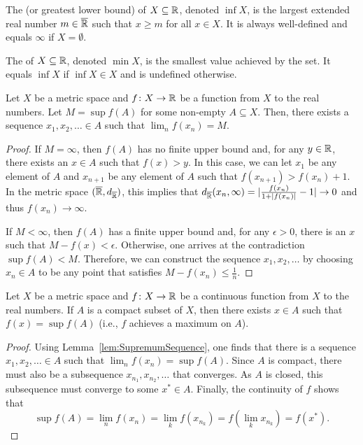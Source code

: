 \begin{definition}
The  (or greatest lower bound) of $X\subseteq \mathbb{R}$, denoted $\inf X$, is the largest extended real number $m \in \overline{\mathbb{R}}$ such that $x\geq m$ for all $x\in X$.
It is always well-defined and equals $\infty$ if $X=\emptyset$.
\end{definition}

\begin{definition}
The  of $X\subseteq \mathbb{R}$, denoted $\min X$, is the smallest value achieved by the set.
It equals $\inf X$ if $\inf X \in X$ and is undefined otherwise.
\end{definition}

\begin{lemma}
\label{lem:SupremumSequence}
Let $X$ be a metric space and $f \colon X\rightarrow \mathbb{R}$ be a function from $X$ to the real numbers.
Let $M = \sup f(A)$ for some non-empty $A \subseteq X$.
Then, there exists a sequence $x_1,x_2,\ldots \in A$ such that $\lim_n f(x_n) = M$.
\end{lemma}
\begin{proof}
If $M=\infty$, then $f(A)$ has no finite upper bound and, for any $y\in \mathbb{R}$, there exists an $x\in A$ such that $f(x)>y$.
In this case, we can let $x_1$ be any element of $A$ and $x_{n+1}$ be any element of $A$ such that $f(x_{n+1}) > f(x_n) + 1$.
In the metric space $(\overline{\mathbb{R}},d_{\overline{\mathbb{R}}})$, this implies that $d_{\overline{\mathbb{R}}}(x_n,\infty) = |\frac{f(x_n)}{1+|f(x_n)|} - 1| \to 0$ and thus $f(x_n) \to \infty$.

If $M<\infty$, then $f(A)$ has a finite upper bound and, for any $\epsilon >0$, there is an $x$ such that $M-f(x)<\epsilon$.
Otherwise, one arrives at the contradiction $\sup f(A) < M$.
Therefore, we can construct the sequence $x_1,x_2,\ldots$ by choosing $x_n\in A$ to be any point that satisfies $M-f(x_n)\leq \frac{1}{n}$.
\end{proof}

\begin{theorem}
Let $X$ be a metric space and $f \colon X\rightarrow \mathbb{R}$ be a continuous function from $X$ to the real numbers.
If $A$ is a compact subset of $X$, then there exists $x\in A$ such that $f(x)=\sup f(A)$ (i.e., $f$ achieves a maximum on $A$).
\end{theorem}
\begin{proof}
Using Lemma~\ref{lem:SupremumSequence}, one finds that there is a sequence $x_1,x_2,\ldots \in A$ such that $\lim_n f(x_n) = \sup f(A)$.
Since $A$ is compact, there must also be a subsequence $x_{n_1},x_{n_2},\ldots$ that converges.
As $A$ is closed, this subsequence must converge to some $x^* \in A$.
Finally, the continuity of $f$ shows that
\[\sup f(A) = \lim_n f(x_n) = \lim_k f(x_{n_k}) = f(\lim_k x_{n_k}) = f(x^*).\]
\end{proof}

